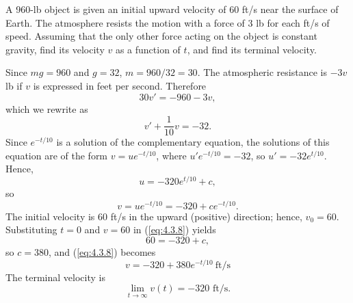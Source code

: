 \setcounter{example}{1}
\begin{example}
  \label{example:4.3.2} \rm A 960-lb object is given an initial upward velocity of 60 ft/s near the
  surface of Earth. The atmosphere resists the motion with a force of 3 lb for each ft/s of speed.
  Assuming that the only other force acting on the object is constant gravity, find its velocity $v$
  as a function of $t$, and find its terminal velocity.
\end{example}
\setcounter{equation}{7}
\begin{examplesolution}
\solution Since $mg=960$ and $g=32$, $m=960/32=30$. The atmospheric resistance is $-3v$ lb if $v$ is
expressed in feet per second. Therefore
\[
  30v'=-960-3v,
\]
which we rewrite as
\[
  v'+\frac{1}{10}v=-32.
\]
Since $e^{-t/10}$ is a solution of the complementary equation, the solutions of this equation are of
the form $v=ue^{-t/10}$, where $u'e^{-t/10}=-32$, so $u'=-32e^{t/10}$. Hence,
\[
  u=-320e^{t/10}+c,
\]
so
\begin{equation}
  \label{eq:4.3.8}v=ue^{-t/10}=-320+ce^{-t/10}.
\end{equation}
The initial velocity is 60 ft/s in the upward (positive) direction; hence, $v_{0}=60$. Substituting
$t=0$ and $v=60$ in (\ref{eq:4.3.8}) yields
\[
  60=-320+c,
\]
so $c=380$, and (\ref{eq:4.3.8}) becomes
\[
  v=-320+380e^{-t/10}\ \mbox{ft/s}
\]
The terminal velocity is
\[
  \lim_{t\to\infty}v(t)=-320\mbox{ ft/s.}
\]
\end{examplesolution}


